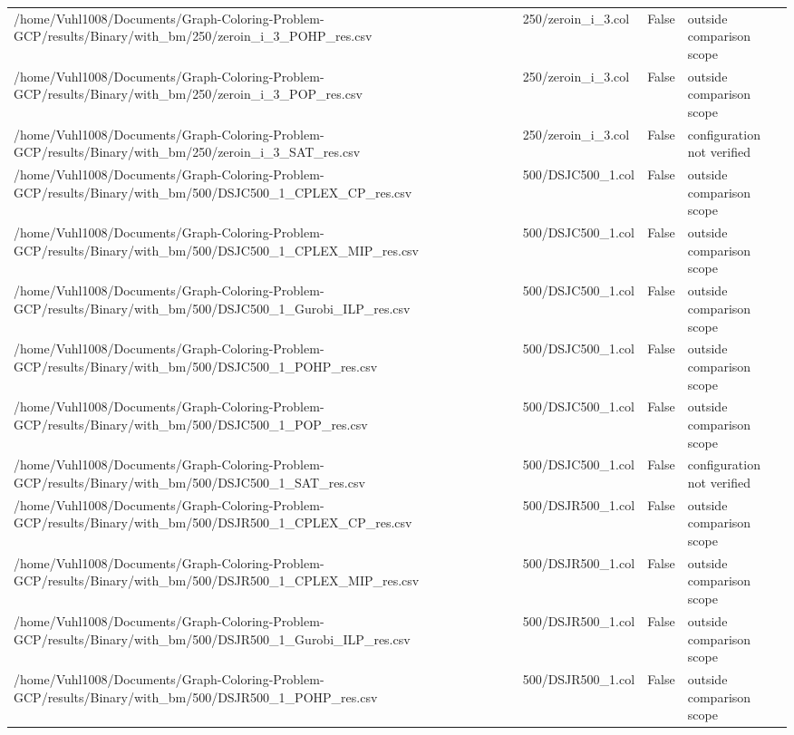\begin{table}[htbp]
\begin{tabular}{llll}
/home/Vuhl1008/Documents/Graph-Coloring-Problem-GCP/results/Binary/with\_bm/250/zeroin\_i\_3\_POHP\_res.csv & 250/zeroin\_i\_3.col & False & outside comparison scope \\
/home/Vuhl1008/Documents/Graph-Coloring-Problem-GCP/results/Binary/with\_bm/250/zeroin\_i\_3\_POP\_res.csv & 250/zeroin\_i\_3.col & False & outside comparison scope \\
/home/Vuhl1008/Documents/Graph-Coloring-Problem-GCP/results/Binary/with\_bm/250/zeroin\_i\_3\_SAT\_res.csv & 250/zeroin\_i\_3.col & False & configuration not verified \\
/home/Vuhl1008/Documents/Graph-Coloring-Problem-GCP/results/Binary/with\_bm/500/DSJC500\_1\_CPLEX\_CP\_res.csv & 500/DSJC500\_1.col & False & outside comparison scope \\
/home/Vuhl1008/Documents/Graph-Coloring-Problem-GCP/results/Binary/with\_bm/500/DSJC500\_1\_CPLEX\_MIP\_res.csv & 500/DSJC500\_1.col & False & outside comparison scope \\
/home/Vuhl1008/Documents/Graph-Coloring-Problem-GCP/results/Binary/with\_bm/500/DSJC500\_1\_Gurobi\_ILP\_res.csv & 500/DSJC500\_1.col & False & outside comparison scope \\
/home/Vuhl1008/Documents/Graph-Coloring-Problem-GCP/results/Binary/with\_bm/500/DSJC500\_1\_POHP\_res.csv & 500/DSJC500\_1.col & False & outside comparison scope \\
/home/Vuhl1008/Documents/Graph-Coloring-Problem-GCP/results/Binary/with\_bm/500/DSJC500\_1\_POP\_res.csv & 500/DSJC500\_1.col & False & outside comparison scope \\
/home/Vuhl1008/Documents/Graph-Coloring-Problem-GCP/results/Binary/with\_bm/500/DSJC500\_1\_SAT\_res.csv & 500/DSJC500\_1.col & False & configuration not verified \\
/home/Vuhl1008/Documents/Graph-Coloring-Problem-GCP/results/Binary/with\_bm/500/DSJR500\_1\_CPLEX\_CP\_res.csv & 500/DSJR500\_1.col & False & outside comparison scope \\
/home/Vuhl1008/Documents/Graph-Coloring-Problem-GCP/results/Binary/with\_bm/500/DSJR500\_1\_CPLEX\_MIP\_res.csv & 500/DSJR500\_1.col & False & outside comparison scope \\
/home/Vuhl1008/Documents/Graph-Coloring-Problem-GCP/results/Binary/with\_bm/500/DSJR500\_1\_Gurobi\_ILP\_res.csv & 500/DSJR500\_1.col & False & outside comparison scope \\
/home/Vuhl1008/Documents/Graph-Coloring-Problem-GCP/results/Binary/with\_bm/500/DSJR500\_1\_POHP\_res.csv & 500/DSJR500\_1.col & False & outside comparison scope \\

\end{tabular}
\end{table}
